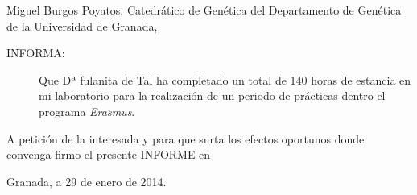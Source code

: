 \documentclass[a4paper,12pt]{article}
\begin{document}
\doublespace

\vspace*{2cm}   
Miguel Burgos Poyatos, Catedrático de Genética del Departamento de Genética de la Universidad de Granada,

\begin{description}
	\item[INFORMA:]Que Dª fulanita de Tal ha completado un total de 140 horas de estancia en mi laboratorio para la realización de un periodo de prácticas dentro el programa \emph{Erasmus}.
\end{description}

A petición de la interesada y para que surta los efectos oportunos donde convenga firmo el presente INFORME en 

Granada, a 29 de enero de 2014.

\begin{center}
\singlespace

								\vspace{3cm}




\end{center}
\end{document}
